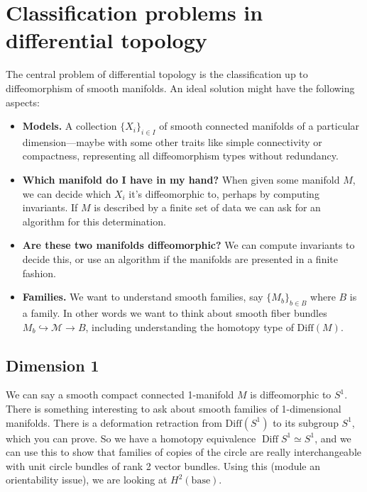 \section{Classification problems in differential topology}
The central problem of differential topology is the classification up to diffeomorphism of smooth manifolds. An ideal solution might have the following aspects:
\begin{itemize}
\setlength\itemsep{-.2em}
    \item \textbf{Models.} A collection $\{X_i \} _{i \in  I}$ of smooth connected manifolds of a particular dimension---maybe with some other traits like simple connectivity or compactness, representing all diffeomorphism types without redundancy.
    \item \textbf{Which manifold do I have in my hand?} When given some manifold $M$, we can decide which $X_i $ it's diffeomorphic to, perhaps by computing invariants. If  $M$ is described by a finite set of data we can ask for an algorithm for this determination.
    \item \textbf{Are these two manifolds diffeomorphic?} We can compute invariants to decide this, or use an algorithm if the manifolds are presented in a finite fashion.
    \item \textbf{Families.} We want to understand smooth families, say $\{M_b\} _{ b \in B}$ where $B$ is a family. In other words we want to think about smooth fiber bundles $M_b \hookrightarrow \mathcal{M} \to B$, including understanding the homotopy type of $\mathrm{Diff}(M)$.
\end{itemize}
\subsection{Dimension 1}
We can say a smooth compact connected 1-manifold $M$ is diffeomorphic to $S^1 $. There is something interesting to ask about smooth families of 1-dimensional manifolds. There is a deformation retraction from $\mathrm{Diff}(S^1 )$ to its subgroup $S^1 $, which you can prove. So we have a homotopy equivalence $\operatorname{Diff}S^1  \simeq S^1 $, and we can use this to show that families of copies of the circle are really interchangeable with unit circle bundles of rank 2 vector bundles. Using this (module an orientability issue), we are looking at $H^2(\mathrm{base})$.

